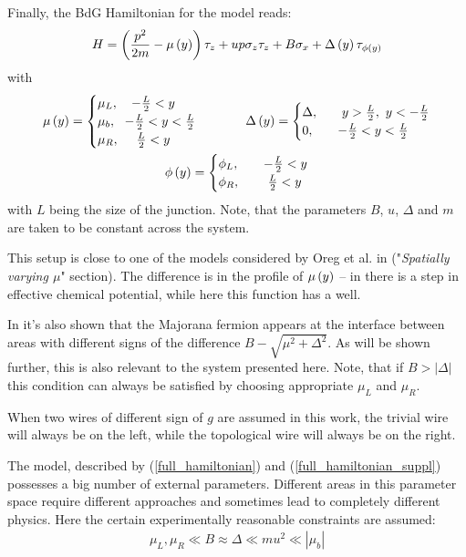 Finally, the BdG Hamiltonian for the model reads:
\begin{equation}
\label{full_hamiltonian}
H
=
\left(
	\frac{p^2}{2m}
	-\mu\left(y\right)
\right)\tau_z
+
u p \sigma_z \tau_z
+
B\sigma_x	
+
\Delta\left(y\right)\tau_{\phi\left(y\right)}
\end{equation}
with
\begin{gather}
\label{full_hamiltonian_suppl}
	\mu\left(y\right)
	=
	\begin{cases}
		\mu_L,~~~  -\frac{L}{2}<y\\
		\mu_b,~~ -\frac{L}{2} <y <\frac{L}{2}\\
		\mu_R, ~~~~ \frac{L}{2}< y  
	\end{cases}
	~~~~~~~~
	\Delta\left(y\right)
	=
	\begin{cases}
		\Delta,&~~~  y>\frac{L}{2},~y<-\frac{L}{2}\\
		0,
		&~~ -\frac{L}{2} <y <\frac{L}{2}\\
	\end{cases}
		\\
	\phi\left(y\right)
	=
	\begin{cases}
	\phi_L,&~~~  -\frac{L}{2}<y\\
	\phi_R, &~~~~ \frac{L}{2}< y 
	\end{cases}
\end{gather}
with $ L $ being the size of the junction. Note, that the parameters $ B $, $ u $, $ \Delta $ and $ m $ are taken to be constant across the system.
 
  This setup is close to one of the models  considered by Oreg et al. in \cite{Oreg_2010} ("\textit{Spatially varying $ \mu $}" section). The difference is in the profile of $ \mu\left(y\right) $ -- in \cite{Oreg_2010}  there is a step in effective chemical potential, while here this function has a well.  
  
 In \cite{Oreg_2010} it's also shown that the Majorana fermion appears at the interface between areas with different signs of the difference $ B-\sqrt{\mu^2+\Delta^2} $.  As will be shown further, this is also relevant to the  system presented here. Note, that if $ B > \left|\Delta\right| $ this condition can always be satisfied by choosing appropriate $ \mu_L $ and $ \mu_R $. 
 
 When two wires of different sign of $ g $ are assumed in this work, the trivial wire will always be on the left, while the topological wire will always be on the right.

 The model, described by (\ref{full_hamiltonian}) and (\ref{full_hamiltonian_suppl}) possesses a big number of external parameters. Different areas in this parameter space require different approaches and sometimes lead to completely different physics. Here the certain experimentally reasonable constraints are assumed:
  \begin{gather}
 \label{constraints}
 	\mu_L,\mu_R \ll B \approx \Delta \ll mu^2\ll \left|\mu_b\right|
 \end{gather} 

